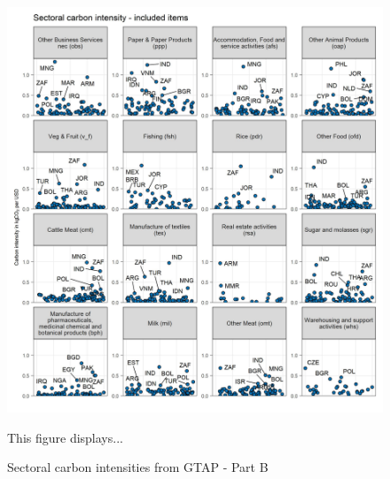 \documentclass[12pt, a4paper]{article}
\newenvironment{subcaption}
{\strut
\vspace{-5pt}
\begin{minipage}[b]{0.9\textwidth}
  \hspace*{-\parindent}
  \footnotesize}
 {\end{minipage}}
\begin{document}
\begin{figure}[ht!]
  \centering
  \caption{Sectoral carbon intensities from GTAP - Part B} \label{fig:B2}
  \includegraphics{Analysis_Carbon_Intensities_GTAP/Figure_2.1.1_B}
  \begin{subcaption}
    This figure displays...
  \end{subcaption}

\end{figure}

\clearpage
\end{document}
